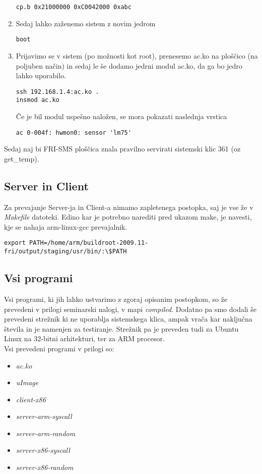 \documentclass[10pt,a4paper]{article}
\begin{document}
\begin{enumerate}
		\begin{lstlisting}
cp.b 0x21000000 0xC0042000 0xabc 		
		\end{lstlisting}
	\item Sedaj lahko zaženemo sistem z novim jedrom
		\begin{lstlisting}
boot
		\end{lstlisting}
	\item Prijavimo se v sistem (po možnosti kot root), prenesemo ac.ko na ploščico (na poljuben način) in sedaj le še dodamo jedrni modul ac.ko, da ga bo jedro lahko uporabilo.
		\begin{lstlisting}
ssh 192.168.1.4:ac.ko .
insmod ac.ko  
		\end{lstlisting}
		Če je bil modul uspešno naložen, se mora pokazati naslednja vrstica
		\begin{lstlisting}
ac 0-004f: hwmon0: sensor 'lm75'
		\end{lstlisting}
\end{enumerate}
Sedaj naj bi FRI-SMS ploščica znala pravilno servirati sistemski klic 361 (oz get\_temp).

\subsection{Server in Client}
Za prevajanje Server-ja in Client-a nimamo zapletenega postopka, saj je vse že v \emph{Makefile} datoteki.
Edino kar je potrebno narediti pred ukazom make, je navesti, kje se nahaja arm-linux-gcc prevajalnik.
		\begin{lstlisting}
export PATH=/home/arm/buildroot-2009.11-fri/output/staging/usr/bin/:\$PATH		
		\end{lstlisting}

\subsection{Vsi programi}
Vsi programi, ki jih lahko ustvarimo z zgoraj opisanim postopkom, so že prevedeni v prilogi seminarski nalogi, v mapi \emph{compiled}. Dodatno pa smo dodali še prevedeni strežnik ki ne uporablja sistemskega klica, ampak vrača kar naključna števila in je namenjen za testiranje. Strežnik pa je preveden tudi za Ubuntu Linux na 32-bitni arhitekturi, ter za ARM procesor. \\
Vsi prevedeni programi v prilogi so:
\begin{itemize}
	\item \emph{ac.ko}
	\item \emph{uImage}
	\item \emph{client-x86}
	\item \emph{server-arm-syscall}
	\item \emph{server-arm-random}
	\item \emph{server-x86-syscall}
	\item \emph{server-x86-random}
\end{itemize}
\end{document}
